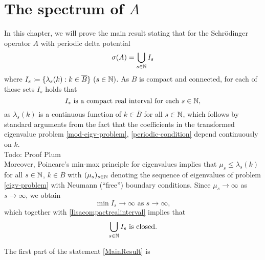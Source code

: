 \chapter{The spectrum of \texorpdfstring{$A$}{A}}	\label{chap4}
In this chapter, we will prove the main result stating that for the Schrödinger operator $A$ with periodic delta potential
	\begin{equation}
		\sigma(A) = \bigcup_{s \in \mathbb{N}} I_{s} \label{MainResult}
	\end{equation}
where $I_{s} \coloneqq \{ \lambda_{s}(k) : k \in \overline{B} \} ~(s \in \mathbb{N})$. As $B$ is compact and connected, for each of those sets $I_{s}$ holds that
	\begin{equation}
		I_{s} \text{ is a compact real interval for each } s \in \mathbb{N},\label{Iisacompactrealinterval}
	\end{equation} 
as $\lambda_{s}(k)$ is a continuous function of $k \in \overline{B}$ for all $s \in \mathbb{N}$, which follows by standard arguments from the fact that the coefficients in the transformed eigenvalue problem \eqref{mod-eigv-problem},  \eqref{periodic-condition} depend continuously on $k$. %
~\\
Todo: Proof Plum %
~\\
Moreover, Poincare's min-max principle for eigenvalues implies that $\mu_{s} \leq \lambda_{s}(k)$ for all $s \in \mathbb{N}$, $k \in \overline{B}$ with $(\mu_{s})_{s \in \mathbb{N}}$ denoting the sequence of eigenvalues of problem \eqref{eigv-problem} with Neumann (``free'') boundary conditions. Since $\mu_{s} \rightarrow \infty$ as $s \rightarrow \infty$, we obtain %
	\[ \min I_{s} \rightarrow \infty \text{ as } s \rightarrow \infty, \]
which together with \eqref{Iisacompactrealinterval} implies that
	\begin{equation}
		\bigcup_{s \in \mathbb{N}} I_{s} \text{ is closed.} \label{UIclosed}
	\end{equation}
	
The first part of the statement \eqref{MainResult} is 

